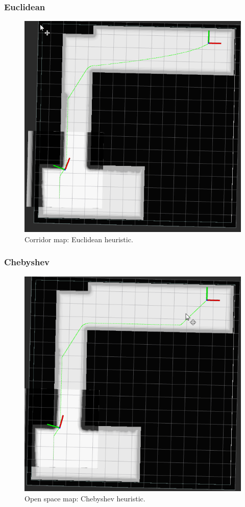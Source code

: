 \documentclass{article}
\begin{document}
\subsubsection*{Euclidean}
\begin{figure}[!ht]
    \centering
    \includegraphics[width=0.9\columnwidth]{../images/euclidean_corridor.png}
    \caption{Corridor map: Euclidean heuristic.}
    \label{fig:euclidean_open}
\end{figure}
\clearpage

\subsubsection*{Chebyshev}
\begin{figure}[!ht]
    \centering
    \includegraphics[width=0.9\columnwidth]{../images/chebyshev_corridor.png}
    \caption{Open space map: Chebyshev heuristic.}
    \label{fig:chebyshev_open}
\end{figure}

\clearpage
\end{document}
